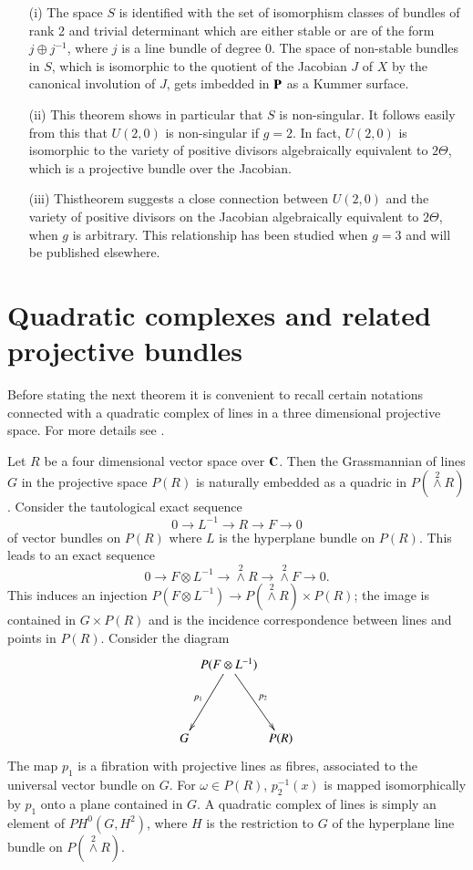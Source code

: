 \begin{remarks*}
\begin{itemize}
\item[(i)] The space $S$ is identified with the set of isomorphism classes of bundles of rank 2 and trivial determinant which are either stable or are of the form $j\oplus j^{-1}$, where $j$ is a line bundle of degree $0$. The space of non-stable bundles in $S$, which is isomorphic to the quotient of the Jacobian $J$ of $X$ by the canonical involution of $J$, gets imbedded in $\mathbf{P}$ as a Kummer surface.

\item[(ii)] This theorem shows in particular that $S$ is non-singular. It follows easily from this that $U(2,0)$ is non-singular if $g=2$. In fact, $U(2,0)$ is isomorphic to the variety of positive divisors algebraically equivalent to $2\Theta$, which is a projective bundle over the Jacobian.

\item[(iii)] This\pageoriginale theorem suggests a close connection between $U(2,0)$ and the variety of positive divisors on the Jacobian algebraically equivalent to $2\Theta$, when $g$ is arbitrary. This relationship has been studied when $g=3$ and will be published elsewhere.
\end{itemize}
\end{remarks*}

\section{Quadratic complexes and related projective bundles}\label{art17-sec5}

Before stating the next theorem it is convenient to recall certain notations connected with a quadratic complex of lines in a three dimensional projective space. For more details see \cite{art17-key3}.

Let $R$ be a four dimensional vector space over $\mathbf{C}$. Then the Grassmannian of lines $G$ in the projective space $P(R)$ is naturally embedded as a quadric in $P({\displaystyle{\mathop{\wedge}\limits^{2}}}R)$. Consider the tautological exact sequence
$$
0\to L^{-1}\to R\to F\to 0
$$
of vector bundles on $P(R)$ where $L$ is the hyperplane bundle on $P(R)$. This leads to an exact sequence
$$
0\to F\otimes L^{-1}\to {\displaystyle{\mathop{\wedge}\limits^{2}}} R\to {\displaystyle{\mathop{\wedge}\limits^{2}}} F\to 0. 
$$
This induces an injection $P(F\otimes L^{-1})\to P({\displaystyle{\mathop{\wedge}\limits^{2}}} R)\times P(R)$; the image is contained in $G\times P(R)$ and is the incidence correspondence between lines and points in $P(R)$. Consider the diagram
\[
\xymatrix@C=.1cm@R=1.5cm{
 & P(F\otimes L^{-1})\ar[dl]_-{p_{1}}\ar[dr]^-{p_{2}} &\\
G & & P(R)
}
\]
The map $p_{1}$ is a fibration with projective lines as fibres, associated to the universal vector bundle on $G$. For $\omega\in P(R)$, $p^{-1}_{2}(x)$ is mapped isomorphically by $p_{1}$ onto a plane contained in $G$. A quadratic complex of lines is simply an element of $PH^{0}(G,H^{2})$, where $H$ is the restriction to $G$ of the hyperplane line bundle on $P({\displaystyle{\mathop{\wedge}\limits^{2}}} R)$.

